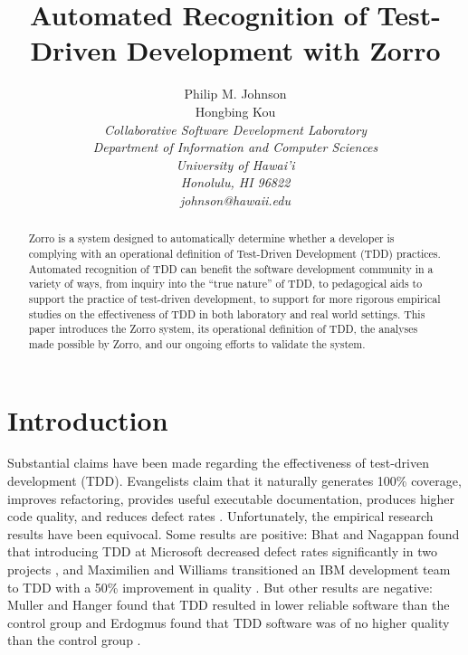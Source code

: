 \documentclass[11pt,twocolumn]{article}
\begin{document}
\title{Automated Recognition of Test-Driven Development with Zorro}

\author{Philip M. Johnson \\
        Hongbing Kou \\
\em  Collaborative Software Development Laboratory \\
\em  Department of Information and Computer Sciences \\
\em  University of Hawai'i \\
\em  Honolulu, HI 96822 \\
\em  johnson@hawaii.edu \\
}


\maketitle

\begin{abstract}  %
Zorro is a system designed to automatically determine whether a developer
is complying with an operational definition of Test-Driven Development
(TDD) practices.  Automated recognition of TDD can benefit the software
development community in a variety of ways, from inquiry into the ``true
nature'' of TDD, to pedagogical aids to support the practice of test-driven
development, to support for more rigorous empirical studies on the effectiveness
of TDD in both laboratory and real world settings.  This paper introduces
the Zorro system, its operational definition of TDD, the analyses made
possible by Zorro, and our ongoing efforts to validate the system.
\end{abstract}

\section{Introduction}
\label{sec:intro}

Substantial claims have been made regarding the effectiveness of
test-driven development (TDD). Evangelists claim that it naturally
generates 100\% coverage, improves refactoring, provides useful executable
documentation, produces higher code quality, and reduces defect rates
\cite{Beck:03}.  Unfortunately, the empirical research results
have been equivocal.  Some results are positive: Bhat and Nagappan
found that introducing TDD at Microsoft decreased defect rates significantly in two projects
\cite{Bhat:06}, and Maximilien and Williams transitioned an IBM development
team to TDD with a 50\% improvement in quality \cite{Maximilien:03}. But other
results are negative: Muller and Hanger found that TDD resulted in lower
reliable software than the control group \cite{Muller:02} and Erdogmus
found that TDD software was of no higher quality than the control group
\cite{Erdogmus:05}.
\end{document}
